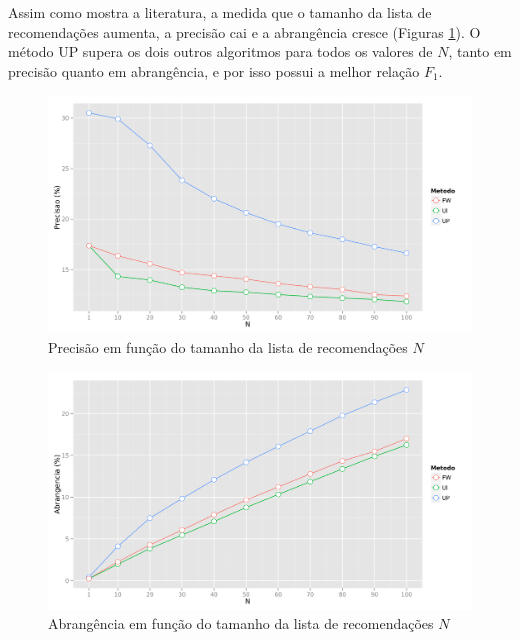 Assim como mostra a literatura, a medida que o tamanho da lista de recomendações aumenta, a precisão cai e a abrangência cresce (Figuras \ref{fig:precision_N}). O método UP supera os dois outros algoritmos para todos os valores de $N$, tanto em precisão quanto em abrangência, e por isso possui a melhor relação $F_1$. 

\begin{figure}[htp]
    \begin{center}
    \includegraphics[width=1\textwidth]{img/precision_N}
    \end{center}
    \label{fig:precision_N}
    \caption{Precisão em função do tamanho da lista de recomendações $N$}
\end{figure}


\begin{figure}[htp]
    \begin{center}
    \includegraphics[width=1\textwidth]{img/recall_N}
    \end{center}
    \label{fig:recall_N}
    \caption{Abrangência em função do tamanho da lista de recomendações $N$}
\end{figure}


